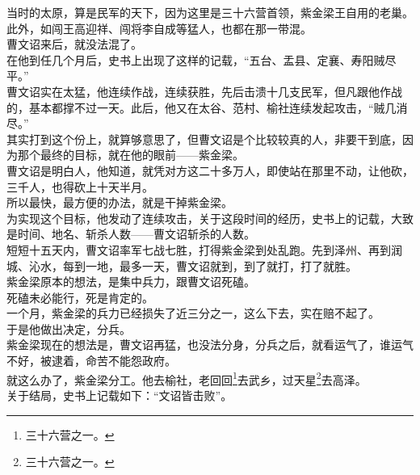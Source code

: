 \begin{multicols}{\theparacolNo}
当时的太原，算是民军的天下，因为这里是三十六营首领，紫金梁王自用的老巢。此外，如闯王高迎祥、闯将李自成等猛人，也都在那一带混。\\

曹文诏来后，就没法混了。\\

在他到任几个月后，史书上出现了这样的记载，“五台、盂县、定襄、寿阳贼尽平。”\\

曹文诏实在太猛，他连续作战，连续获胜，先后击溃十几支民军，但凡跟他作战的，基本都撑不过一天。此后，他又在太谷、范村、榆社连续发起攻击，“贼几消尽。”\\

其实打到这个份上，就算够意思了，但曹文诏是个比较较真的人，非要干到底，因为那个最终的目标，就在他的眼前——紫金梁。\\

曹文诏是明白人，他知道，就凭对方这二十多万人，即使站在那里不动，让他砍，三千人，也得砍上十天半月。\\

所以最快，最方便的办法，就是干掉紫金梁。\\

为实现这个目标，他发动了连续攻击，关于这段时间的经历，史书上的记载，大致是时间、地名、斩杀人数——曹文诏斩杀的人数。\\

短短十五天内，曹文诏率军七战七胜，打得紫金梁到处乱跑。先到泽州、再到润城、沁水，每到一地，最多一天，曹文诏就到，到了就打，打了就胜。\\

紫金梁原本的想法，是集中兵力，跟曹文诏死磕。\\

死磕未必能行，死是肯定的。\\

一个月，紫金梁的兵力已经损失了近三分之一，这么下去，实在赔不起了。\\

于是他做出决定，分兵。\\

紫金梁现在的想法是，曹文诏再猛，也没法分身，分兵之后，就看运气了，谁运气不好，被逮着，命苦不能怨政府。\\

就这么办了，紫金梁分工。他去榆社，老回回\footnote{三十六营之一。}去武乡，过天星\footnote{三十六营之一。}去高泽。\\

关于结局，史书上记载如下：“文诏皆击败”。\\


\end{multicols}
